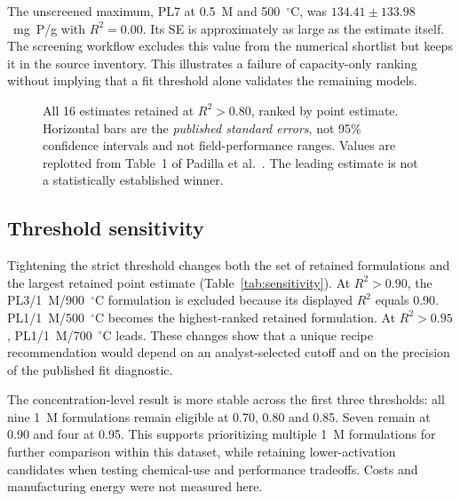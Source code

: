 \documentclass[11pt,letterpaper]{article}
\begin{document}
The unscreened maximum, PL7 at 0.5~M and 500~$^\circ$C, was $134.41\pm133.98$~mg~P/g with $R^2=0.00$. Its SE is approximately as large as the estimate itself. The screening workflow excludes this value from the numerical shortlist but keeps it in the source inventory. This illustrates a failure of capacity-only ranking without implying that a fit threshold alone validates the remaining models.

\begin{figure}[p]
\centering
{}
\caption{All 16 estimates retained at $R^2>0.80$, ranked by point estimate. Horizontal bars are the \emph{published standard errors}, not 95\% confidence intervals and not field-performance ranges. Values are replotted from Table~1 of Padilla et al.~\cite{padilla}. The leading estimate is not a statistically established winner.}
\label{fig:capacity}
\end{figure}

\subsection{Threshold sensitivity}
Tightening the strict threshold changes both the set of retained formulations and the largest retained point estimate (Table~\ref{tab:sensitivity}). At $R^2>0.90$, the PL3/1~M/900~$^\circ$C formulation is excluded because its displayed $R^2$ equals 0.90. PL1/1~M/500~$^\circ$C becomes the highest-ranked retained formulation. At $R^2>0.95$, PL1/1~M/700~$^\circ$C leads. These changes show that a unique recipe recommendation would depend on an analyst-selected cutoff and on the precision of the published fit diagnostic.

The concentration-level result is more stable across the first three thresholds: all nine 1~M formulations remain eligible at 0.70, 0.80 and 0.85. Seven remain at 0.90 and four at 0.95. This supports prioritizing multiple 1~M formulations for further comparison within this dataset, while retaining lower-activation candidates when testing chemical-use and performance tradeoffs. Costs and manufacturing energy were not measured here.
\end{document}
